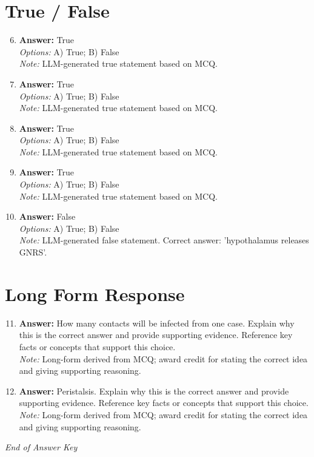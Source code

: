 \documentclass[12pt]{article}
\begin{document}
\section*{True / False}
\begin{enumerate}[label=\arabic*.]
\setcounter{enumi}{5}
\item \textbf{Answer:} True
\\ \textit{Options:} A) True; B) False
\\ \textit{Note:} LLM-generated true statement based on MCQ.
\item \textbf{Answer:} True
\\ \textit{Options:} A) True; B) False
\\ \textit{Note:} LLM-generated true statement based on MCQ.
\item \textbf{Answer:} True
\\ \textit{Options:} A) True; B) False
\\ \textit{Note:} LLM-generated true statement based on MCQ.
\item \textbf{Answer:} True
\\ \textit{Options:} A) True; B) False
\\ \textit{Note:} LLM-generated true statement based on MCQ.
\item \textbf{Answer:} False
\\ \textit{Options:} A) True; B) False
\\ \textit{Note:} LLM-generated false statement. Correct answer: 'hypothalamus releases GNRS'.
\end{enumerate}

\section*{Long Form Response}
\begin{enumerate}[label=\arabic*.]
\setcounter{enumi}{10}
\item \textbf{Answer:} How many contacts will be infected from one case. Explain why this is the correct answer and provide supporting evidence. Reference key facts or concepts that support this choice.
\\ \textit{Note:} Long-form derived from MCQ; award credit for stating the correct idea and giving supporting reasoning.
\item \textbf{Answer:} Peristalsis. Explain why this is the correct answer and provide supporting evidence. Reference key facts or concepts that support this choice.
\\ \textit{Note:} Long-form derived from MCQ; award credit for stating the correct idea and giving supporting reasoning.
\end{enumerate}

\vfill
\noindent\textit{End of Answer Key}
\end{document}
